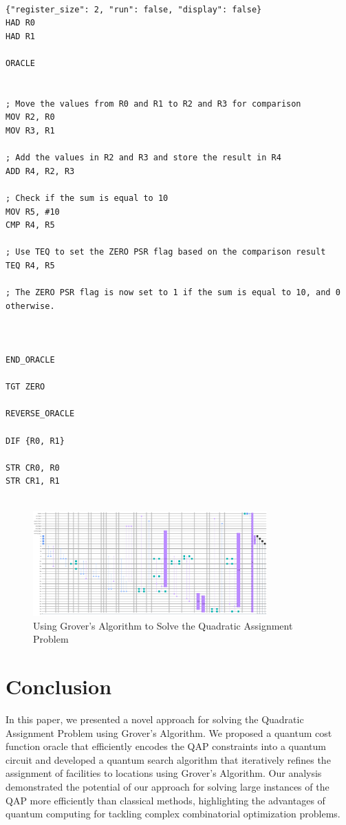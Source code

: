 \begin{lstlisting}

{"register_size": 2, "run": false, "display": false}
HAD R0
HAD R1

ORACLE


; Move the values from R0 and R1 to R2 and R3 for comparison
MOV R2, R0
MOV R3, R1

; Add the values in R2 and R3 and store the result in R4
ADD R4, R2, R3

; Check if the sum is equal to 10
MOV R5, #10
CMP R4, R5

; Use TEQ to set the ZERO PSR flag based on the comparison result
TEQ R4, R5

; The ZERO PSR flag is now set to 1 if the sum is equal to 10, and 0 otherwise.



END_ORACLE

TGT ZERO

REVERSE_ORACLE

DIF {R0, R1}

STR CR0, R0
STR CR1, R1


\end{lstlisting}

\begin{figure}[htp]
    \centering
    \includegraphics[width=9cm]{Figures/Quadratic_Assignment_circuit.png}
    \caption{Using Grover's Algorithm to Solve the Quadratic Assignment Problem}
    \label{fig:Quadratic_Assignment}
\end{figure}

\section{Conclusion}\label{sec:conclusion}

In this paper, we presented a novel approach for solving the Quadratic Assignment Problem using Grover's Algorithm. We proposed a quantum cost function oracle that efficiently encodes the QAP constraints into a quantum circuit and developed a quantum search algorithm that iteratively refines the assignment of facilities to locations using Grover's Algorithm. Our analysis demonstrated the potential of our approach for solving large instances of the QAP more efficiently than classical methods, highlighting the advantages of quantum computing for tackling complex combinatorial optimization problems.

